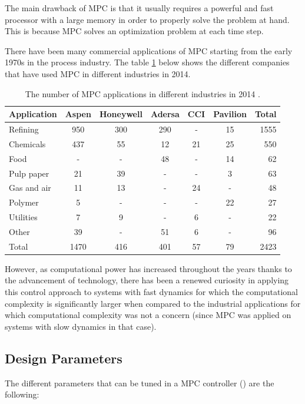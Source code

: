 \documentclass{thesisreport}
\begin{document}
\noindent The main drawback of MPC is that it usually requires a powerful and fast processor with a large memory in order to properly solve the problem at hand. This is because MPC solves an optimization problem at each time step.
 
\noindent There have been many commercial applications of MPC starting from the early 1970s in the process industry. The table \ref{table_MPC} below shows the different companies that have used MPC in different industries in 2014.
 

\begin{table}[h]
\setlength{\tabcolsep}{15pt} %
\renewcommand{\arraystretch}{1} %
 \caption{The number of MPC applications in different industries in 2014 \cite{Kozak2014}.}
 \label{table_MPC}
\begin{tabular}{l c c c c c r}
Application & Aspen & Honeywell & Adersa & CCI & Pavilion & Total \\
\hline
Refining & 950 & 300 & 290 & - & 15 & 1555 \\
Chemicals & 437 & 55 & 12 & 21 & 25 & 550 \\
Food & - & - & 48 & - & 14 & 62 \\
Pulp paper & 21 & 39 & - & - & 3 & 63 \\
Gas and air & 11 & 13 & - & 24 & - & 48 \\
Polymer & 5 & - & - & - & 22 & 27 \\
Utilities & 7 & 9 & - & 6 & - & 22 \\
Other & 39 & - & 51 & 6 & - & 96 \\
\hline 
\hline
Total & 1470 & 416 & 401 & 57 & 79 & 2423 \\
\end{tabular}
\end{table}

\noindent However, as computational power has increased throughout the years thanks to the advancement of technology, there has been a renewed curiosity in applying this control approach to systems with fast dynamics for which the computational complexity is significantly larger when compared to the industrial applications for which computational complexity was not a concern (since MPC was applied on systems with slow dynamics in that case).
 
\subsection{Design Parameters}\label{design_parameters}
The different parameters that can be tuned in a MPC controller (\cite{MathWorks2018, MathWorks2018b, MathWorks2018c}) are the following:
\end{document}
